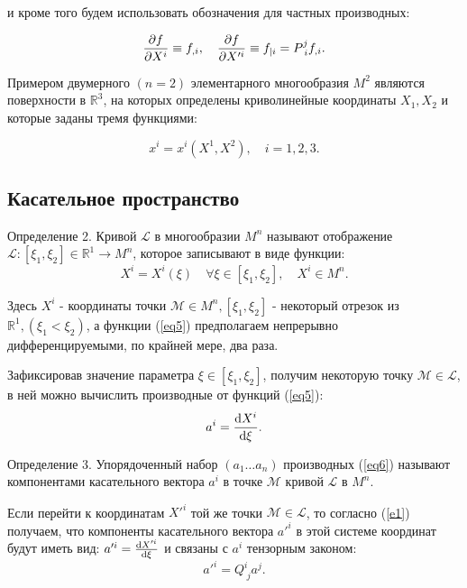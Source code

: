 \documentclass[14pt,a4paper]{extarticle}
\begin{document}
и кроме того будем использовать обозначения для частных производных:

\begin{equation}\label{eq3}
	\pdv{f}{X^i} \equiv f_{,i}, \quad \pdv{f}{X'^i} \equiv f_{|i} = P_{\; i}^j f_{,i}.
\end{equation}

Примером двумерного $(n = 2)$ элементарного многообразия $M^2$ являются поверхности в $\mathbb{R}^3$, на которых определены криволинейные координаты $X_1, X_2$ и которые заданы тремя функциями:

\begin{equation}\label{eq4}
	x^i = x^{i}(X^1, X^2), \quad i=1,2,3.
\end{equation}
\subsection{Касательное пространство}
Определение 2. Кривой $\mathcal{L}$ в многообразии $M^n$ называют отображение $\mathcal{L}: [\xi_1,\xi_2] \in \mathbb{R}^1 \longrightarrow M^n$, которое записывают в виде функции:
\begin{equation}\label{eq5}
	X^i = X^i(\xi) \quad \forall \xi \in [\xi_1, \xi_2], \quad X^i \in M^n.	
\end{equation}

Здесь $X^i$ - координаты точки $\mathcal{M} \in M^n, [\xi_1, \xi_2]$ - некоторый отрезок из $\mathbb{R}^1, (\xi_1 < \xi_2)$, а функции (\ref{eq5}) предполагаем непрерывно дифференцируемыми, по крайней мере, два раза.


Зафиксировав значение параметра $\xi \in [\xi_1,\xi_2]$, получим некоторую точку $\mathcal{M} \in \mathcal{L}$, в ней можно вычислить производные от функций (\ref{eq5}):
\begin{equation}\label{eq6}
	a^i = \dv{X^i}{\xi}.
\end{equation}

Определение 3. Упорядоченный набор $(a_1\dots a_n)$ производных (\ref{eq6}) называют компонентами касательного вектора $a^i$ в точке $\mathcal{M}$ кривой $\mathcal{L}$ в $ M^n $.

Если перейти к координатам $X'^i$ той же точки $\mathcal{M} \in \mathcal{L}$, то согласно (\ref{e1}) получаем, что компоненты касательного вектора $a'^i$ в этой системе координат будут иметь вид: $a'^i = \dv{X'^i}{\xi}$ и связаны с $a^i$ тензорным законом:
\begin{equation}\label{eq7}
	a'^i = Q_{\; j}^i a^j.
\end{equation}
\end{document}

